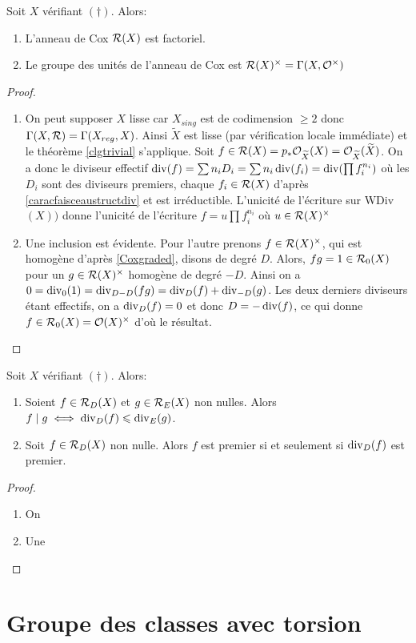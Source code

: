 \begin{prop}
Soit $X$ vérifiant $(\dagger)$. Alors:
\begin{enumerate}
\item L'anneau de Cox $\mathcal{R}(X)$ est factoriel.
\item Le groupe des unités de l'anneau de Cox est $\mathcal{R}(X)^\times=\Gamma(X,\mathcal{O}^\times)$
\end{enumerate}
\end{prop}
\begin{proof}
\begin{enumerate}
\item On peut supposer $X$ lisse car $X_{sing}$ est de codimension $\geq 2$ donc $\Gamma(X, \mathcal{R})=\Gamma(X_{reg}, X)$. Ainsi $\widetilde{X}$ est lisse (par vérification locale immédiate) et le théorème \ref{clgtrivial} s'applique. Soit $f\in \mathcal{R}(X)=p_*\mathcal{O}_{\widetilde{X}}(X)=\mathcal{O}_{\widetilde{X}}(\widetilde{X})$. On a donc le diviseur effectif $\operatorname{div}(f)= \sum n_iD_i=\sum n_i\operatorname{div}(f_i)=\operatorname{div}(\prod f_i^{n_i})$ où les $D_i$ sont des diviseurs premiers, chaque $f_i\in \mathcal{R}(X)$ d'après \ref{caracfaisceaustructdiv} et est irréductible. L'unicité de l'écriture sur WDiv$(X))$ donne l'unicité de l'écriture $f=u\prod f_i^{n_i}$ où $u\in \mathcal{R}(X)^\times$
\item Une inclusion est évidente. Pour l'autre prenons $f\in\mathcal{R}(X)^\times$, qui est homogène d'après \ref{Coxgraded}, disons de degré $D$. Alors, $fg=1\in \mathcal{R}_0(X)$ pour un $g\in\mathcal{R}(X)^\times$ homogène de degré $-D$. Ainsi on a $0=\operatorname{div}_0(1)=\operatorname{div}_{D-D}(fg)=\operatorname{div}_D(f)+\operatorname{div}_{-D}(g)$. Les deux derniers diviseurs étant effectifs, on a $\operatorname{div}_D(f)=0$ et donc $D=-\operatorname{div}(f)$, ce qui donne $f\in\mathcal{R}_0(X)=\mathcal{O}(X)^\times$ d'où le résultat.
\end{enumerate}
\end{proof}

\begin{prop}
Soit $X$ vérifiant $(\dagger)$. Alors:
\begin{enumerate}
\item Soient $f\in \mathcal{R}_D(X)$ et $g\in \mathcal{R}_E(X)$ non nulles. Alors $f\mid g\iff \operatorname{div}_D(f)\leqslant\operatorname{div}_E(g)$.
\item Soit $f\in \mathcal{R}_D(X)$ non nulle. Alors $f$ est premier si et seulement si $\operatorname{div}_D(f)$ est premier.
\end{enumerate}
\end{prop}
\begin{proof}
\begin{enumerate}
\item On
\item Une
\end{enumerate}
\end{proof}

\section{Groupe des classes avec torsion}
